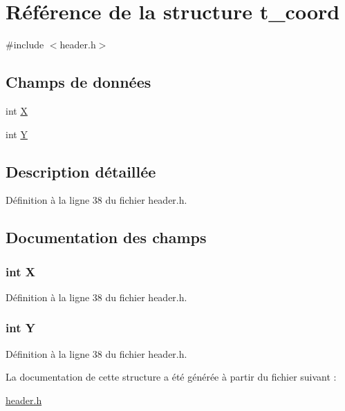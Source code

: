 \hypertarget{structt__coord}{\section{Référence de la structure t\-\_\-coord}
\label{structt__coord}
}


{\ttfamily \#include $<$header.\-h$>$}

\subsection*{Champs de données}
\begin{DoxyCompactItemize}
\item 
int \hyperlink{structt__coord_a80c0944640e62d3ed6c5419c1bcc0c88}{X}
\item 
int \hyperlink{structt__coord_aa482c4cc86a24474e4fb19b5b5978778}{Y}
\end{DoxyCompactItemize}


\subsection{Description détaillée}


Définition à la ligne 38 du fichier header.\-h.



\subsection{Documentation des champs}
\hypertarget{structt__coord_a80c0944640e62d3ed6c5419c1bcc0c88}{
\subsubsection[{X}]{\setlength{\rightskip}{0pt plus 5cm}int X}}\label{structt__coord_a80c0944640e62d3ed6c5419c1bcc0c88}


Définition à la ligne 38 du fichier header.\-h.

\hypertarget{structt__coord_aa482c4cc86a24474e4fb19b5b5978778}{
\subsubsection[{Y}]{\setlength{\rightskip}{0pt plus 5cm}int Y}}\label{structt__coord_aa482c4cc86a24474e4fb19b5b5978778}


Définition à la ligne 38 du fichier header.\-h.



La documentation de cette structure a été générée à partir du fichier suivant \-:\begin{DoxyCompactItemize}
\item 
\hyperlink{header_8h}{header.\-h}\end{DoxyCompactItemize}
